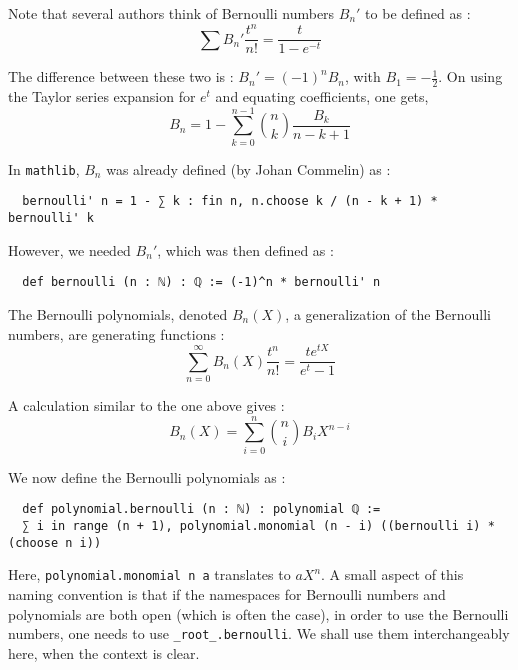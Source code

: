 \documentclass[11pt]{article}
\newcommand{\lean}[1]{\texttt{#1}\xspace} %
\begin{document}
Note that several authors think of Bernoulli numbers $B_n'$ to be defined as :
$$\sum B_n'\frac{t^n}{n!}=\frac{t}{1-e^{-t}}$$

The difference between these two is : $B_n' = (-1)^n B_n$, with $B_1 = - \frac{1}{2}$.
On using the Taylor series expansion for $e^t$ and equating coefficients, one gets,
$$ B_n = 1 - \sum_{k = 0}^{n - 1} {n \choose k} \frac{B_k}{n - k + 1} $$

In \texttt{mathlib}, $B_n$ was already defined (by Johan Commelin) as :
\begin{lstlisting}
  bernoulli' n = 1 - ∑ k : fin n, n.choose k / (n - k + 1) * bernoulli' k
\end{lstlisting}
However, we needed $B_n'$, which was then defined as :
\begin{lstlisting}
  def bernoulli (n : ℕ) : ℚ := (-1)^n * bernoulli' n
\end{lstlisting}

The Bernoulli polynomials, denoted $B_n(X)$, a generalization of the Bernoulli numbers,
are generating functions :
$$ \sum_{n = 0}^{\infty} B_n(X) \frac{t^n}{n!} = \frac{t e^{tX}}{e^t - 1} $$

A calculation similar to the one above gives :
$$ B_n (X) = \sum_{i = 0}^n {n \choose i} B_i X^{n - i} $$

We now define the Bernoulli polynomials as :
\begin{lstlisting}
  def polynomial.bernoulli (n : ℕ) : polynomial ℚ :=
  ∑ i in range (n + 1), polynomial.monomial (n - i) ((bernoulli i) * (choose n i))
\end{lstlisting}

Here, \lean{polynomial.monomial n a} translates to $a X^n$. A small aspect of this 
naming convention is that if the namespaces for Bernoulli numbers and polynomials are both open 
(which is often the case), in order to use the Bernoulli numbers, one needs to use \lean{\_root\_.bernoulli}. 
We shall use them interchangeably here, when the context is clear. \\
\end{document}

